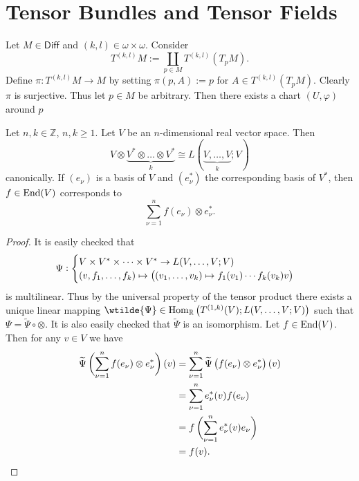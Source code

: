 \section*{Tensor Bundles and Tensor Fields}

Let $M \in \mathsf{Diff}$ and $(k,l) \in \omega \times \omega$. Consider 
\begin{equation*}
	T^{(k,l)}M := \coprod_{p \in M} T^{(k,l)}(T_pM).
\end{equation*}
Define $\pi : T^{(k,l)}M \to M$ by setting $\pi(p,A) := p$ for $A \in T^{(k,l)}(T_pM)$. Clearly $\pi$ is surjective. Thus let $p \in M$ be arbitrary. Then there exists a chart $(U,\varphi)$ around $p$ 


\begin{lemma}
	\label{lem:corr}
Let $n,k \in \mathbb{Z}$, $n,k \geq 1$. Let $V$ be an $n$-dimensional real vector space. Then
\begin{equation}
	V \otimes \underbrace{V^* \otimes \dots \otimes V^*}_{k} \cong L(\underbrace{V,\dots,V}_{k};V)
\end{equation}
\noindent canonically. If $(e_\nu)$ is a basis of $V$ and $(e_\nu^*)$ the corresponding basis of $V^*$, then $f \in \operatorname{End}(V)$ corresponds to
\begin{equation}
\sum_{\nu = 1}^n f(e_\nu) \otimes e_\nu^*.
\end{equation}
\end{lemma}

\begin{proof}
It is easily checked that
\begin{equation*}
\Psi:\begin{cases} 
	V \times V^* \times \dots \times V^* \to L(V,\dots,V;V)\\
(v,f_1,\dots,f_k) \mapsto \del[1]{(v_1,\dots,v_k) \mapsto f_1(v_1)\cdots f_k(v_k)v}
\end{cases}
\end{equation*}
\noindent is multilinear. Thus by the universal property of the tensor product there exists a unique linear mapping $\wtilde{\Psi} \in \Hom_\mathbb{R}\del[1]{T^{(1,k)}(V); L(V,\dots,V;V)}$ such that $\Psi = \widetilde{\Psi} \circ \otimes$. It is also easily checked that $\widetilde{\Psi}$ is an isomorphism. Let $f \in \operatorname{End}(V)$. Then for any $v \in V$ we have
\begin{align*}
\widetilde{\Psi}\del[3]{\sum_{\nu = 1}^n f(e_\nu) \otimes e_\nu^*}(v) &= \sum_{\nu = 1}^n \widetilde{\Psi}\del[1]{f(e_\nu) \otimes e_\nu^*}(v)\\
&= \sum_{\nu = 1}^n e_\nu^*(v)f(e_\nu)\\
&= f\del[3]{\sum_{\nu = 1}^n e_\nu^*(v)e_\nu}\\
&= f(v).
\end{align*}
\end{proof}

